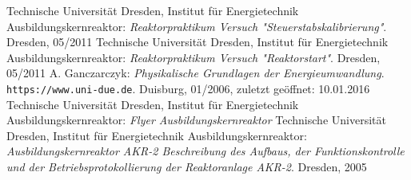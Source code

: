 \begin{thebibliography}{99}
 Technische Universität Dresden,  Institut für Energietechnik Ausbildungskernreaktor: \textit{Reaktorpraktikum Versuch "Steuerstabskalibrierung"}. Dresden, 05/2011 
Technische Universität Dresden,  Institut für Energietechnik Ausbildungskernreaktor: \textit{Reaktorpraktikum Versuch "Reaktorstart"}. Dresden, 05/2011
 A. Ganczarczyk: \textit{Physikalische Grundlagen der Energieumwandlung}. \texttt{https://www.uni-due.de}. Duisburg, 01/2006, zuletzt geöffnet: 10.01.2016
Technische Universität Dresden, Institut für Energietechnik Ausbildungskernreaktor: \textit{Flyer Ausbildungskernreaktor}
 Technische Universität Dresden, Institut für Energietechnik Ausbildungskernreaktor: \textit{Ausbildungskernreaktor AKR-2 Beschreibung des Aufbaus, der Funktionskontrolle und der Betriebsprotokollierung der Reaktoranlage AKR-2}. Dresden, 2005

\end{thebibliography}

